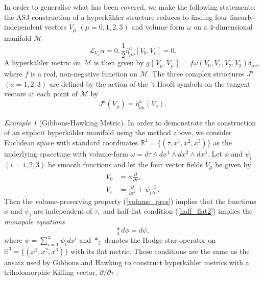 \documentclass[a4paper,onecolumn,12pt]{article}
\theoremstyle{definition}
\theoremstyle{remark}
\newtheorem{ex}[thm]{Example}
\newcommand{\al}{\alpha}
\newcommand{\w}{\omega}
\newcommand{\m}{\mu}
\newcommand{\n}{\nu}
\newcommand{\ddt}[1]{\frac{\partial #1}{\partial \tau}}
\newcommand{\dd}[2]{\frac{\partial #1}{\partial #2}}
\newcommand{\HK}{hyperk\"ahler }
\newcommand{\x}[1]{x^{#1}}
\newcommand{\R}{\mathbb{R}}
\newcommand{\hooft}[3]{\bar{\eta}^{#1}_{#2 #3}}
\newcommand{\vol}{\w=d\tau\wedge dx^{1}\wedge dx^{2}\wedge dx^{3}}
\begin{document}
In order to generalise what has been covered, we make the following statements: the ASJ construction of a \HK structure reduces to finding four linearly-independent vectors $V_{\m}$ $(\m=0,1,2,3)$ and volume form $\w$ on a 4-dimensional manifold $\mathcal{M}$ \cite{ashtekar_1987,ashtekar_1988}
\begin{subequations}
	\begin{equation}
		\label{volume_pres}
		\mathcal{L}_{V_{a}}\al = 0,
	\end{equation}
	\begin{equation}
		\label{half_flat2}
		\frac{1}{2}\hooft{a}{\m}{\n}[V_{b},V_{c}] = 0.
	\end{equation}
\end{subequations}
A \HK metric on $\mathcal{M}$ is then given by $g(V_{\m},V_{\m})=f\w(V_{0},V_{1},V_{2},V_{3})\delta_{\m\n},$ where $f$ is a real, non-negative function on $\mathcal{M}.$ The three complex structures $J^{a}$ $(a=1,2,3)$ are defined by the action of the 't Hooft symbols on the tangent vectors at each point of $\mathcal{M}$ by
\begin{equation}
	J^{a}(V_{\m}) = \hooft{a}{\n}{\m}(V_{\n}).
\end{equation}
\begin{ex}[Gibbons-Hawking Metric]
	In order to demonstrate the construction of an explicit \HK manifold using the method above, we consider Euclidean space with standard coordinates $\R^{4} = \{(\tau,\x{1},\x{2},\x{3})\}$ as the underlying spacetime with volume-form $\vol$. Let $\phi$ and $\psi_{i}$ $(i=1,2,3)$ be smooth functions and let the four vector fields $V_{\mu}$ be given by
	\begin{subequations}
		\begin{align}
			V_{0} &= \phi\ddt{},\\
			V_{i} &= \dd{}{\x{i}} + \psi_{i}\ddt{}.
		\end{align}
	\end{subequations}
	Then the volume-preserving property (\ref{volume_pres}) implies that the functions $\phi$ and $\psi_{i}$ are independent of $\tau,$ and half-flat condition (\ref{half_flat2}) implies the \emph{monopole equations}
	\begin{equation}
		\underset{3}{\ast} d\phi = d\psi,
	\end{equation}
	where $\psi = \sum_{i=1}^{3}\psi_{i}d\x{i}$ and $\ast_{3}$ denotes the Hodge star operator on $\R^{3} = \{(\x{1},\x{2},\x{3})\}$ with its flat metric. These conditions are the same as the ansatz used by Gibbons and Hawking to construct \HK metrics with a triholomorphic Killing vector, $\partial/\partial\tau$ \cite{gibbons_1978}.
\end{ex}
\end{document}
